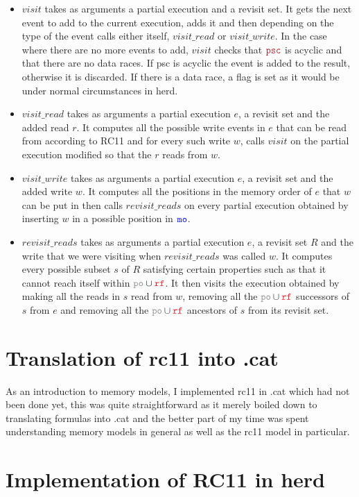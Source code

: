 \documentclass[a4,11pt,dvipsnames]{article}
\begin{document}
\begin{itemize}
\item $visit$ takes as arguments a partial execution and a revisit set. It gets the next event to add to the current execution, adds it and then depending on the type of the event calls either itself, $visit\_read$ or $visit\_write$. In the case where there are no more events to add, $visit$ checks that $\psc$ is acyclic and that there are no data races. If psc is acyclic the event is added to the result, otherwise it is discarded. If there is a data race, a flag is set as it would be under normal circumstances in herd.
\item $visit\_read$ takes as arguments a partial execution $e$, a revisit set and the added read $r$. It computes all the possible write events in $e$ that can be read from according to RC11 and for every such write $w$, calls $visit$ on the partial execution modified so that the $r$ reads from $w$.
\item $visit\_write$ takes as arguments a partial execution $e$, a revisit set and the added write $w$. It computes all the positions in the memory order of $e$ that $w$ can be put in then calls $revisit\_reads$ on every partial execution obtained by inserting $w$ in a possible position in $\texttt{\color{blue}mo}$.
\item $revisit\_reads$ takes as arguments a partial execution $e$, a revisit set $R$ and the write that we were visiting when $revisit\_reads$ was called $w$. It computes every possible subset $s$ of $R$ satisfying certain properties such as that it cannot reach itself within $\po\cup\rf$. It then visits the execution obtained by making all the reads in $s$ read from $w$, removing all the $\po\cup \rf$ successors of $s$ from $e$ and removing all the $\po\cup\rf$ ancestors of $s$ from its revisit set.
\end{itemize}

\section{Translation of rc11 into .cat}

As an introduction to memory models, I implemented rc11 in .cat which had not been done yet, this was quite straightforward as it merely boiled down to translating formulas into .cat and the better part of my time was spent understanding memory models in general as well as the rc11 model in particular.

\section{Implementation of RC11 in herd}
\end{document}

